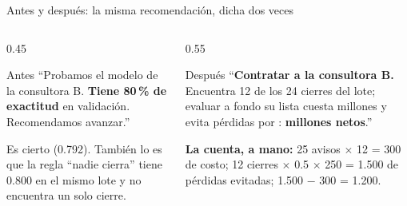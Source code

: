 \documentclass{beamer}
\begin{document}
\begin{frame}{Antes y después: la misma recomendación, dicha dos veces}
\begin{columns}[T]
\begin{column}{0.45\textwidth}
\begin{alertblock}{Antes}
``Probamos el modelo de la consultora B. \textbf{Tiene 80\,\% de exactitud} en validación. Recomendamos avanzar.''
\end{alertblock}
\footnotesize Es cierto (0.792). También lo es que la regla ``nadie cierra'' tiene 0.800 en el mismo lote y no encuentra un solo cierre.
\end{column}
\begin{column}{0.55\textwidth}
\begin{exampleblock}{Después}
``\textbf{Contratar a la consultora B.} Encuentra 12 de los 24 cierres del lote; evaluar a fondo su lista cuesta  millones y evita pérdidas por : \textbf{ millones netos}.''
\end{exampleblock}
\footnotesize \textbf{La cuenta, a mano:} 25 avisos $\times$ 12 = 300 de costo; 12 cierres $\times$ 0.5 $\times$ 250 = 1.500 de pérdidas evitadas; 1.500 $-$ 300 = 1.200.
\end{column}
\end{columns}
\medskip
{}
\end{frame}
\end{document}
